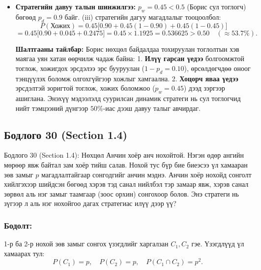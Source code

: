 \documentclass[11pt,a4paper]{article}
\begin{document}
\begin{itemize}[leftmargin=1.4em, itemsep=3pt]
  \item[\textbf{(б)}] 				\textbf{Стратегийн давуу талын шинжилгээ:}
  $p_w = 0.45 < 0.5$ (Борис сул тоглогч) бөгөөд $p_d = 0.9$ байг.
  (iii) стратегийн дагуу магадлалыг тооцоолбол:
  \[
    P(\text{Хожих}) = 0.45 \big[ 0.90 + 0.45(1 - 0.90) + 0.45(1 - 0.45) \big]
  \]
  \[
    = 0.45 \big[ 0.90 + 0.045 + 0.2475 \big] = 0.45 \times 1.1925 = \mathbf{0.536625 > 0.50} \quad (\approx 53.7\%).
  \]

  				\textbf{Шалтгааны тайлбар:}
  Борис нөхцөл байдалдаа тохируулан тоглолтын хэв маягаа уян хатан өөрчилж чадаж байна:
  1. 				\textbf{Илүү гарсан үедээ} болгоомжтой тоглож, хожигдох эрсдэлээ эрс бууруулан ($1 - p_d = 0.10$), өрсөлдөгчдөө оноог тэнцүүлэх боломж олгохгүйгээр хожлыг хамгаална.
  2. 				\textbf{Хоцорч яваа үедээ} эрсдэлтэй зоригтой тоглож, хожих боломжоо ($p_w = 0.45$) дээд зэргээр ашиглана.
  Энэхүү мэдээлэлд суурилсан динамик стратеги нь сул тоглогчид нийт тэмцээний дүнгээр $50\%$-иас дээш давуу талыг авчирдаг.
\end{itemize}

\vspace{0.8em}

\subsection*{Бодлого 30 (Section 1.4)}

\begin{problembox}{Бодлого 30 (Section 1.4): Нөхцөл}
Анчин хоёр анч нохойтой. Нэгэн өдөр ангийн мөрөөр явж байтал зам хоёр тийш салав. Нохой тус бүр бие биеэсээ үл хамааран зөв замыг $p$ магадлалтайгаар сонгодгийг анчин мэднэ. Анчин хоёр нохойд сонголт хийлгэхээр шийдсэн бөгөөд хэрэв тэд санал нийлбэл тэр замаар явж, хэрэв санал зөрвөл аль нэг замыг таамгаар (зоос орхин) сонгохоор болов. Энэ стратеги нь зүгээр л аль нэг нохойгоо дагах стратегиас илүү дээр үү?
\end{problembox}

\subsubsection*{Бодолт:}

1-р ба 2-р нохой зөв замыг сонгох үзэгдлийг харгалзан $C_1, C_2$ гэе. Үзэгдлүүд үл хамаарах тул:
\[
  P(C_1) = p, \quad P(C_2) = p, \quad P(C_1 \cap C_2) = p^2.
\]
\end{document}
